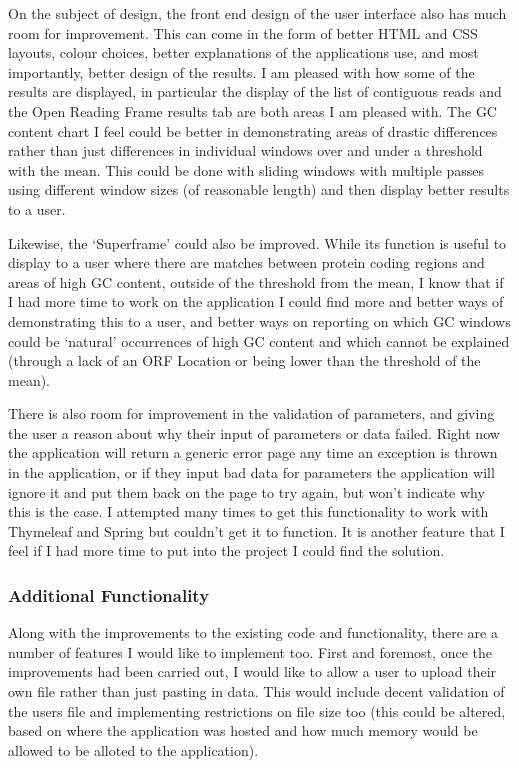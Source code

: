 On the subject of design, the front end design of the user interface also has much room for improvement. This can come in the form of better HTML and CSS layouts, colour choices, better explanations of the applications use, and most importantly, better design of the results. I am pleased with how some of the results are displayed, in particular the display of the list of contiguous reads and the Open Reading Frame results tab are both areas I am pleased with. The GC content chart I feel could be better in demonstrating areas of drastic differences rather than just differences in individual windows over and under a threshold with the mean. This could be done with sliding windows with multiple passes using different window sizes (of reasonable length) and then display better results to a user.

Likewise, the `Superframe' could also be improved. While its function is useful to display to a user where there are matches between protein coding regions and areas of high GC content, outside of the threshold from the mean, I know that if I had more time to work on the application I could find more and better ways of demonstrating this to a user, and better ways on reporting on which GC windows could be `natural' occurrences of high GC content and which cannot be explained (through a lack of an ORF Location or being lower than the threshold of the mean).

There is also room for improvement in the validation of parameters, and giving the user a reason about why their input of parameters or data failed. Right now the application will return a generic error page any time an exception is thrown in the application, or if they input bad data for parameters the application will ignore it and put them back on the page to try again, but won't indicate why this is the case. I attempted many times to get this functionality to work with Thymeleaf and Spring but couldn't get it to function. It is another feature that I feel if I had more time to put into the project I could find the solution.

\subsubsection{Additional Functionality}
Along with the improvements to the existing code and functionality, there are a number of features I would like to implement too. First and foremost, once the improvements had been carried out, I would like to allow a user to upload their own file rather than just pasting in data. This would include decent validation of the users file and implementing restrictions on file size too (this could be altered, based on where the application was hosted and how much memory would be allowed to be alloted to the application).

